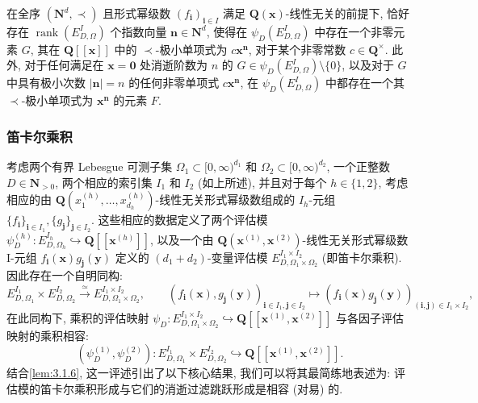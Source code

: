 \begin{lemma}\label{lem:3.1.6}
在全序 \((\mathbf{N}^d, \prec)\) 且形式幂级数 \((f_{\mathbf{i}})_{\mathbf{i}\in I}\) 满足 \(\mathbf{Q}(\mathbf{x})\)-线性无关的前提下, 恰好存在 \(\operatorname{rank}(E_{D,\Omega}^I)\) 个指数向量 \(\mathbf{n} \in \mathbf{N}^d\), 使得在 \(\psi_D\left(E_{D,\Omega}^I\right)\) 中存在一个非零元素 \(G\), 其在 \(\mathbf{Q}[\![\mathbf{x}]\!]\) 中的 \(\prec\)-极小单项式为 \(c\mathbf{x}^{\mathbf{n}}\), 对于某个非零常数 \(c \in \mathbf{Q}^{\times}\).
此外, 对于任何满足在 \(\mathbf{x} = \mathbf{0}\) 处消逝阶数为 \(n\) 的 \(G \in \psi_D(E_{D,\Omega}^I) \setminus \{0\}\), 以及对于 \(G\) 中具有极小次数 \(|\mathbf{n}| = n\) 的任何非零单项式 \(c \mathbf{x}^{\mathbf{n}}\), 在 \(\psi_D\left(E_{D,\Omega}^I\right)\) 中都存在一个其 \(\prec\)-极小单项式为 \(\mathbf{x}^{\mathbf{n}}\) 的元素 \(F\).
\end{lemma}

\subsubsection{笛卡尔乘积}\label{sec:3.1.7}

考虑两个有界 Lebesgue 可测子集 \(\Omega_1 \subset [0,\infty)^{d_1}\) 和 \(\Omega_2 \subset [0,\infty)^{d_2}\), 一个正整数 \(D \in \mathbf{N}_{>0}\), 两个相应的索引集 \(I_1\) 和 \(I_2\) (如上所述), 
并且对于每个 \(h \in \{1,2\}\), 考虑相应的由 \(\mathbf{Q}\left(x_1^{(h)},\ldots,x_{d_h}^{(h)}\right)\)-线性无关形式幂级数组成的 \(I_h\)-元组 \(\{f_{\mathbf{i}}\}_{\mathbf{i}\in I_1},\{g_{\mathbf{j}}\}_{\mathbf{j}\in I_2}\). 
这些相应的数据定义了两个评估模 \(\psi_D^{(h)}: E_{D,\Omega_h}^{I_h} \hookrightarrow \mathbf{Q}[\![\mathbf{x}^{(h)}]\!]\), 
以及一个由 \(\mathbf{Q}(\mathbf{x}^{(1)},\mathbf{x}^{(2)})\)-线性无关形式幂级数 I-元组 \(f_{\mathbf{i}}(\mathbf{x})g_{\mathbf{j}}(\mathbf{y})\) 定义的 \((d_1+d_2)\)-变量评估模 \(E_{D,\Omega_1\times\Omega_2}^{I_1\times I_2}\) (即笛卡尔乘积). 
因此存在一个自明同构:
\begin{equation}\label{eq:3.1.8}
E_{D,\Omega_{1}}^{I_{1}} \times E_{D,\Omega_{2}}^{I_{2}} \xrightarrow{\simeq} E_{D,\Omega_{1} \times \Omega_{2}}^{I_{1} \times I_{2}}, \qquad (f_{\mathbf{i}}(\mathbf{x}), g_{\mathbf{j}}(\mathbf{y}))_{\mathbf{i} \in I_{1}, \mathbf{j} \in I_{2}} \mapsto (f_{\mathbf{i}}(\mathbf{x})g_{\mathbf{j}}(\mathbf{y}))_{(\mathbf{i}, \mathbf{j}) \in I_{1} \times I_{2}},
\end{equation}
在此同构下, 乘积的评估映射 \(\psi_D: E_{D,\Omega_1 \times \Omega_2}^{I_1 \times I_2} \hookrightarrow \mathbf{Q}[\![\mathbf{x}^{(1)},\mathbf{x}^{(2)}]\!]\) 与各因子评估映射的乘积相容:
\[ (\psi_D^{(1)}, \psi_D^{(2)}) : E_{D,\Omega_1}^{I_1} \times E_{D,\Omega_2}^{I_2} \hookrightarrow \mathbf{Q}[\![\mathbf{x}^{(1)}, \mathbf{x}^{(2)}]\!]. \]
结合\autoref{lem:3.1.6}, 这一评述引出了以下核心结果, 我们可以将其最简练地表述为: 评估模的笛卡尔乘积形成与它们的消逝过滤跳跃形成是相容 (对易) 的.

